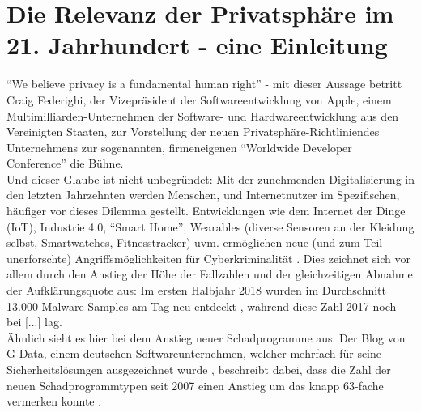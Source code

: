 \chapter{Die Relevanz der Privatsphäre im 21. Jahrhundert - eine Einleitung} %
\label{Introduction} %

\enquote{We believe privacy is a fundamental human right} \cite{WWDC:20} - mit dieser Aussage betritt Craig Federighi, der Vizepräsident der Softwareentwicklung von Apple, einem Multimilliarden-Unternehmen der Software- und Hardwareentwicklung aus den Vereinigten Staaten, zur Vorstellung der 
neuen Privatsphäre-Richtliniendes Unternehmens zur sogenannten, firmeneigenen \enquote{Worldwide Developer Conference} die Bühne. \\ Und dieser Glaube ist nicht unbegründet: Mit der zunehmenden Digitalisierung in den letzten Jahrzehnten werden Menschen, und Internetnutzer im Spezifischen, 
häufiger vor dieses Dilemma gestellt. Entwicklungen wie dem Internet der Dinge (IoT), Industrie 4.0, \enquote{Smart Home}, Wearables (diverse Sensoren an der Kleidung selbst, Smartwatches, Fitnesstracker) uvm. ermöglichen neue (und zum Teil unerforschte) Angriffsmöglichkeiten für Cyberkriminalität \cite{BLB:18}.
Dies zeichnet sich vor allem durch den Anstieg der Höhe der Fallzahlen und der gleichzeitigen Abnahme der Aufklärungsquote aus: Im ersten Halbjahr 2018 wurden im Durchschnitt 13.000 Malware-Samples am Tag neu entdeckt \cite{GDB:18}, während diese Zahl 2017 noch bei [...] lag. \\ Ähnlich sieht es hier bei
dem Anstieg neuer Schadprogramme aus: Der Blog von G Data, einem deutschen Softwareunternehmen, welcher mehrfach für seine Sicherheitslösungen ausgezeichnet wurde \cite{GD+1}, beschreibt dabei, dass die Zahl der neuen Schadprogrammtypen seit 2007 einen Anstieg um das knapp 63-fache vermerken konnte \cite{GDB:17}.